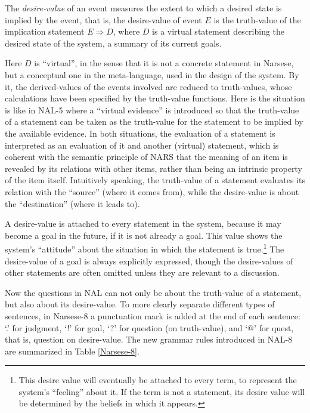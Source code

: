 \begin{defi}
The \emph{desire-value} of an event measures the extent to which a desired state is implied by the event, that is, the desire-value of event $E$ is the truth-value of the implication statement \(E \Rightarrow D\), where $D$ is a virtual statement describing the desired state of the system, a summary of its current goals.
\end{defi}
Here $D$ is ``virtual'', in the sense that it is not a concrete statement in Narsese, but a conceptual one in the meta-language, used in the design of the system. By it, the derived-values of the events involved are reduced to truth-values, whose calculations have been specified by the truth-value functions. Here is the situation is like in NAL-5 where a ``virtual evidence'' is introduced so that the truth-value of a statement can be taken as the truth-value for the statement to be implied by the available evidence. In both situations, the evaluation of a statement is interpreted as an evaluation of it and another (virtual) statement, which is coherent with the semantic principle of NARS that the meaning of an item is revealed by its relations with other items, rather than being an intrinsic property of the item itself. Intuitively speaking, the truth-value of a statement evaluates its relation with the ``source'' (where it comes from), while the desire-value is about the ``destination'' (where it leads to).

A desire-value is attached to every statement in the system, because it may become a goal in the future, if it is not already a goal.  This value shows the system's ``attitude'' about the situation in which the statement is true.\footnote{This desire value will eventually be attached to every term, to represent the system's ``feeling'' about it. If the term is not a statement, its desire value will be determined by the beliefs in which it appears.} The desire-value of a goal is always explicitly expressed, though the desire-values of other statements are often omitted unless they are relevant to a discussion.

Now the questions in NAL can not only be about the truth-value of a statement, but also about its desire-value. To more clearly separate different types of sentences, in Narsese-8 a punctuation mark is added at the end of each sentence: `.' for judgment, `!' for goal, `?' for question (on truth-value), and `$@$' for quest, that is, question on desire-value. The new grammar rules introduced in NAL-8 are summarized in Table \ref{Narsese-8}.

